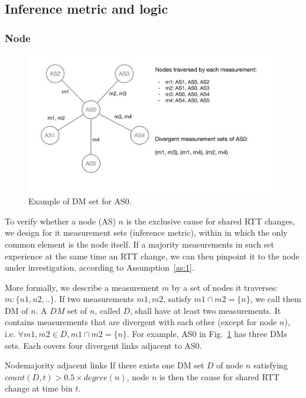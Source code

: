 \subsection{Inference metric and logic}
\subsubsection{Node}
\begin{figure}[!htb]
\centering
\includegraphics[width=1\textwidth]{gfx/chap5/dms.pdf}
\caption{Example of \acf{DM} set for AS0.}
\label{fig:chap5_dms}
\end{figure}

To verify whether a node (AS) $n$ is the exclusive cause for shared RTT changes, we
design for it measurement sets (inference metric), within in which the only common element is the node itself. If a majority measurements in such set experience at the same time an RTT change, we can then pinpoint it to the node under investigation, according to Assumption~\ref{as:1}.

More formally, we describe a measurement $m$ by a set of nodes it traverses: $m:\{n1, n2,..\}$. 
If two measurements $m1, m2$, satisfy $m1 \cap m2 = \{n\}$, we call them \acf{DM} of $n$.
A $DM$ set of $n$, called $D$, shall have at least two measurements. It contains measurements that are divergent with each other (except for node $n$), i.e. $\forall m1, m2 \in D, m1 \cap m2 = \{n\}$.
For example, AS0 in Fig.~\ref{fig:chap5_dms} has three \acp{DM} sets. Each covers four divergent links adjacent to AS0.

\begin{heuristic}{Node}{majority adjacent links}\label{hu:node}
If there exists one \ac{DM} set $D$ of node $n$ satisfying $count(D, t) > 0.5 \times degree(n)$,  node $n$ is then the cause for shared RTT change at time bin $t$. 
\end{heuristic}

